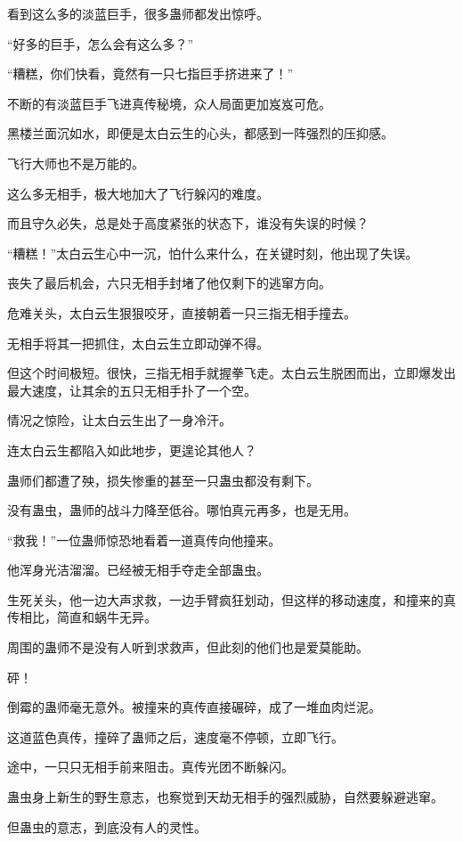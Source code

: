 \begin{this_body}
看到这么多的淡蓝巨手，很多蛊师都发出惊呼。

“好多的巨手，怎么会有这么多？”

“糟糕，你们快看，竟然有一只七指巨手挤进来了！”

不断的有淡蓝巨手飞进真传秘境，众人局面更加岌岌可危。

黑楼兰面沉如水，即便是太白云生的心头，都感到一阵强烈的压抑感。

飞行大师也不是万能的。

这么多无相手，极大地加大了飞行躲闪的难度。

而且守久必失，总是处于高度紧张的状态下，谁没有失误的时候？

“糟糕！”太白云生心中一沉，怕什么来什么，在关键时刻，他出现了失误。

丧失了最后机会，六只无相手封堵了他仅剩下的逃窜方向。

危难关头，太白云生狠狠咬牙，直接朝着一只三指无相手撞去。

无相手将其一把抓住，太白云生立即动弹不得。

但这个时间极短。很快，三指无相手就握拳飞走。太白云生脱困而出，立即爆发出最大速度，让其余的五只无相手扑了一个空。

情况之惊险，让太白云生出了一身冷汗。

连太白云生都陷入如此地步，更遑论其他人？

蛊师们都遭了殃，损失惨重的甚至一只蛊虫都没有剩下。

没有蛊虫，蛊师的战斗力降至低谷。哪怕真元再多，也是无用。

“救我！”一位蛊师惊恐地看着一道真传向他撞来。

他浑身光洁溜溜。已经被无相手夺走全部蛊虫。

生死关头，他一边大声求救，一边手臂疯狂划动，但这样的移动速度，和撞来的真传相比，简直和蜗牛无异。

周围的蛊师不是没有人听到求救声，但此刻的他们也是爱莫能助。

砰！

倒霉的蛊师毫无意外。被撞来的真传直接碾碎，成了一堆血肉烂泥。

这道蓝色真传，撞碎了蛊师之后，速度毫不停顿，立即飞行。

途中，一只只无相手前来阻击。真传光团不断躲闪。

蛊虫身上新生的野生意志，也察觉到天劫无相手的强烈威胁，自然要躲避逃窜。

但蛊虫的意志，到底没有人的灵性。


\end{this_body}
